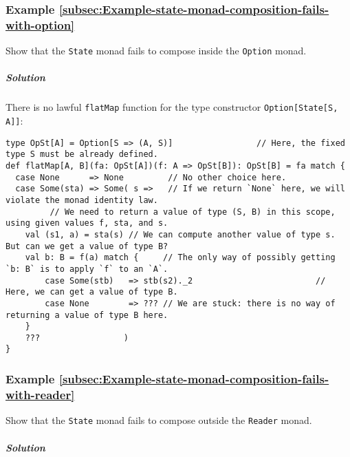 \subsubsection{Example \label{subsec:Example-state-monad-composition-fails-with-option}\ref{subsec:Example-state-monad-composition-fails-with-option}}

Show that the \lstinline!State! monad fails to compose inside the
\lstinline!Option! monad.

\subparagraph{Solution}

There is no lawful \lstinline!flatMap! function for the type constructor
\lstinline!Option[State[S, A]]!:
\begin{lstlisting}
type OpSt[A] = Option[S => (A, S)]                 // Here, the fixed type S must be already defined.
def flatMap[A, B](fa: OpSt[A])(f: A => OpSt[B]): OpSt[B] = fa match {
  case None      => None         // No other choice here.
  case Some(sta) => Some( s =>   // If we return `None` here, we will violate the monad identity law.
         // We need to return a value of type (S, B) in this scope, using given values f, sta, and s.
    val (s1, a) = sta(s) // We can compute another value of type s. But can we get a value of type B?
    val b: B = f(a) match {     // The only way of possibly getting `b: B` is to apply `f` to an `A`.
        case Some(stb)   => stb(s2)._2                         // Here, we can get a value of type B.
        case None        => ??? // We are stuck: there is no way of returning a value of type B here.
    }
    ???                 )
}
\end{lstlisting}


\subsubsection{Example \label{subsec:Example-state-monad-composition-fails-with-reader}\ref{subsec:Example-state-monad-composition-fails-with-reader}}

Show that the \lstinline!State! monad fails to compose outside the
\lstinline!Reader! monad.

\subparagraph{Solution}

